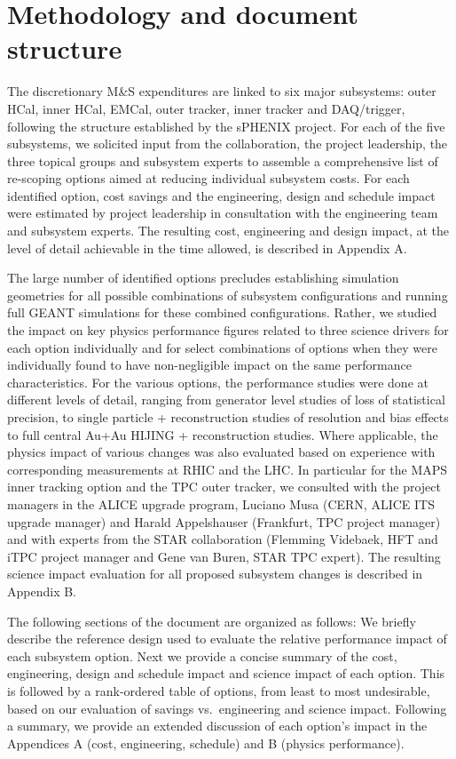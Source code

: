 \section{Methodology and document structure}

The discretionary M\&S expenditures are linked to six major subsystems: outer HCal, inner HCal, EMCal, outer tracker, inner tracker and DAQ/trigger, 
following the structure established by the sPHENIX project. For each of the five subsystems, we solicited input from the collaboration, the 
project leadership, the three topical groups and subsystem experts to assemble a comprehensive list of re-scoping options aimed at reducing 
individual subsystem costs. For each identified option, cost savings and the engineering, design and schedule impact were estimated by project 
leadership in consultation with the engineering team and subsystem experts. The resulting cost, engineering and design impact, at the 
level of detail achievable in the time allowed, is described in Appendix A.

The large number of identified options precludes establishing simulation geometries for all possible combinations of subsystem configurations
and running full GEANT simulations for these combined configurations. Rather, we studied the impact on key physics performance figures
related to three science drivers for each option individually and for select combinations of options when they were individually found to
have non-negligible impact on the same performance characteristics. For the various options, the performance studies were done at different 
levels of detail, ranging from generator level studies of loss of statistical precision, to single particle \geant + reconstruction studies 
of resolution and bias effects to full central Au+Au HIJING \geant + reconstruction studies. Where applicable, the physics impact of various
changes was also evaluated based on experience with corresponding
measurements at RHIC and the LHC. In particular for the MAPS inner tracking 
option and the TPC outer tracker, we consulted with the project managers in the ALICE upgrade program, Luciano Musa (CERN, ALICE ITS upgrade 
manager) and Harald Appelshauser (Frankfurt, TPC project manager) and with experts from the STAR collaboration (Flemming Videbaek, HFT and
iTPC project manager and Gene van Buren, STAR TPC expert). The resulting science impact evaluation for all proposed subsystem changes 
is described in Appendix B.

The following sections of the document are organized as follows: We briefly describe the reference design used to evaluate the relative
performance impact of each subsystem option. Next we provide a concise summary of the cost, engineering, design and schedule impact and 
science impact of each option. This is followed by a rank-ordered table of options, from least to most undesirable, based on our 
evaluation of savings vs.\ engineering and science impact. Following a summary, we provide an extended discussion of each option's impact
in the Appendices A (cost, engineering, schedule) and B (physics performance).


